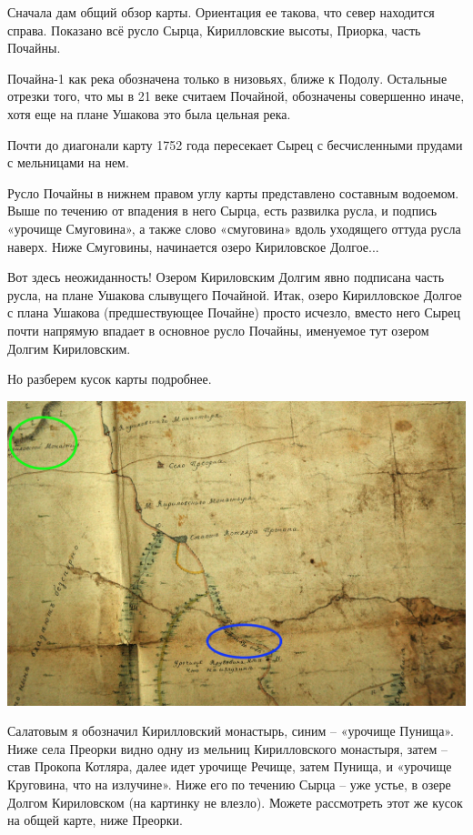 Сначала дам общий обзор карты. Ориентация ее такова, что север находится справа. Показано всё русло Сырца, Кирилловские высоты, Приорка, часть Почайны.

Почайна-1 как река обозначена только в низовьях, ближе к Подолу. Остальные отрезки того, что мы в 21 веке считаем Почайной, обозначены совершенно иначе, хотя еще на плане Ушакова это была цельная река.

Почти до диагонали карту 1752 года пересекает Сырец с бесчисленными прудами с мельницами на нем. 

Русло Почайны в нижнем правом углу карты представлено составным водоемом. Выше по течению от впадения в него Сырца, есть развилка русла, и подпись «урочище Смуговина», а также слово «смуговина» вдоль уходящего оттуда русла наверх. Ниже Смуговины, начинается озеро Кириловское Долгое...

Вот здесь неожиданность! Озером Кириловским Долгим явно подписана часть русла, на плане Ушакова слывущего Почайной. Итак, озеро Кирилловское Долгое с плана Ушакова (предшествующее Почайне) просто исчезло, вместо него Сырец почти напрямую впадает в основное русло Почайны, именуемое тут озером Долгим Кириловским.

Но разберем кусок карты подробнее.

\begin{center}
\includegraphics[width=\linewidth]{chast-colebanie-osnov/pochayna/1752-pun.jpg}
\end{center}

Салатовым я обозначил Кирилловский монастырь, синим – «урочище Пунища». Ниже села Преорки видно одну из мельниц Кирилловского монастыря, затем – став Прокопа Котляра, далее идет урочище Речище, затем Пунища, и «урочище Круговина, что на излучине». Ниже его по течению Сырца – уже устье, в озере Долгом Кириловском (на картинку не влезло). Можете рассмотреть этот же кусок на общей карте, ниже Преорки.

